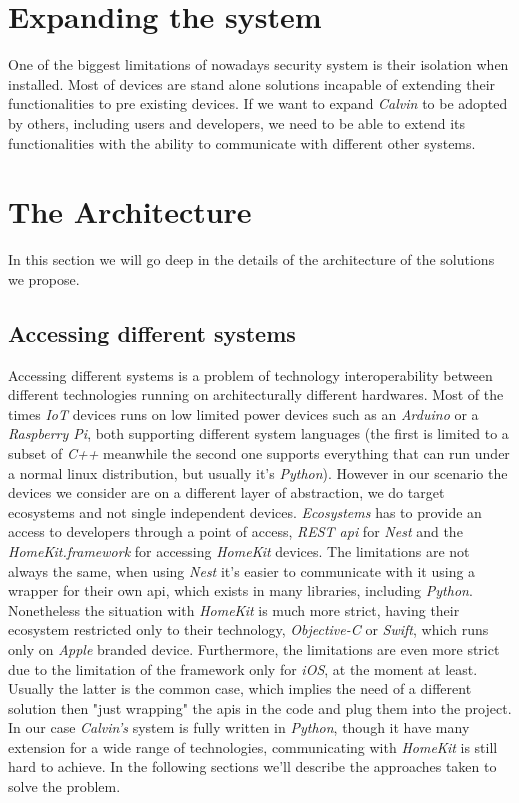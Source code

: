 \section{Expanding the system}
One of the biggest limitations of nowadays security system is their isolation
when installed. Most of devices are stand alone solutions incapable of extending
their functionalities to pre existing devices. If we want to expand \textit{Calvin} to
be adopted by others, including users and developers, we need to be able to extend its
functionalities with the ability to communicate with different other systems.

\section{The Architecture}

In this section we will go deep in the details of the architecture of the solutions
we propose.

\subsection{Accessing different systems}

Accessing different systems is a problem of technology interoperability between
different technologies running on architecturally different hardwares.
Most of the times \textit{IoT} devices runs on low limited power devices such as
an \textit{Arduino} or a \textit{Raspberry Pi}, both supporting different system
languages (the first is limited to a subset of \textit{C++} meanwhile the second one supports everything
that can run under a normal linux distribution, but usually it's \textit{Python}).
However in our scenario the devices we consider are on a different layer of abstraction,
we do target ecosystems and not single independent devices. \textit{Ecosystems} has to
provide an access to developers through a point of access, \textit{REST api} for   \textit{Nest}
and the \textit{HomeKit.framework} for accessing \textit{HomeKit} devices.
The limitations are not always the same, when using \textit{Nest} it's easier to communicate
with it using a wrapper for their own api, which exists in many libraries, including \textit{Python}.
Nonetheless the situation with \textit{HomeKit} is much more strict, having their ecosystem
restricted only to their technology, \textit{Objective-C} or \textit{Swift}, which runs only
on \textit{Apple} branded device. Furthermore, the limitations are even more strict
due to the limitation of the framework only for \textit{iOS}, at the moment at least.
Usually the latter is the common case, which implies the need of a different solution
then "just wrapping" the apis in the code and plug them into the project.
In our case \textit{Calvin's} system is fully written in \textit{Python},
though it have many extension for a wide range of technologies, communicating
with \textit{HomeKit} is still hard to achieve.
In the following sections we'll describe the approaches taken to solve
the problem.


